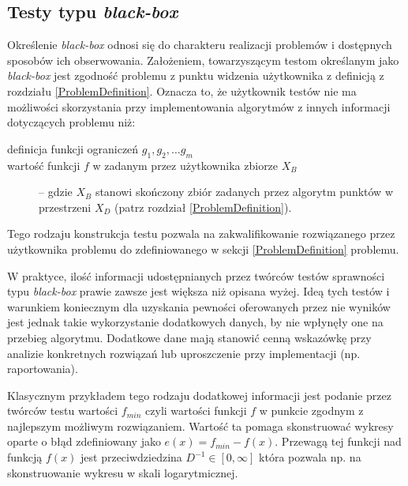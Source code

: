 \documentclass[12pt,a4paper]{report}
\begin{document}
{{{{{\subsection{Testy typu \emph{black-box}}
\par{
Określenie \emph{black-box} odnosi się do charakteru realizacji problemów i dostępnych sposobów ich obserwowania. Założeniem, towarzyszącym testom określanym jako \emph{black-box} jest zgodność problemu z punktu widzenia użytkownika z definicją z rozdziału \ref{ProblemDefinition}. Oznacza to, że użytkownik testów nie ma możliwości skorzystania przy implementowania algorytmów z innych informacji dotyczących problemu niż:
\begin{description}
\item[definicja funkcji ograniczeń $g_1, g_2, \ldots g_m$]
\item[wartość funkcji $f$ w zadanym przez użytkownika zbiorze $X_B$] -- gdzie $X_B$ stanowi skończony zbiór zadanych przez algorytm punktów w przestrzeni $X_D$ (patrz rozdział \ref{ProblemDefinition}).
\end{description}
Tego rodzaju konstrukcja testu pozwala na zakwalifikowanie rozwiązanego przez użytkownika problemu do zdefiniowanego w sekcji \ref{ProblemDefinition} problemu.
}
\par{
W praktyce, ilość informacji udostępnianych przez twórców testów sprawności typu \emph{black-box} prawie zawsze jest większa niż opisana wyżej. Ideą tych testów i warunkiem koniecznym dla uzyskania pewności oferowanych przez nie wyników jest jednak takie wykorzystanie dodatkowych danych, by nie wpłynęły one na przebieg algorytmu. Dodatkowe dane mają stanowić cenną wskazówkę przy analizie konkretnych rozwiązań lub uproszczenie przy implementacji (np. raportowania).
\par{
Klasycznym przykładem tego rodzaju dodatkowej informacji jest podanie przez twórców testu wartości $f_{min}$ czyli wartości funkcji $f$ w punkcie zgodnym z najlepszym możliwym rozwiązaniem. Wartość ta pomaga skonstruować wykresy oparte o błąd zdefiniowany jako $e(x) = f_{min} - f(x)$. Przewagą tej funkcji nad funkcją $f(x)$ jest przeciwdziedzina $D^{-1} \in [0, \infty]$ która pozwala np. na skonstruowanie wykresu w skali logarytmicznej.
}

}}}}}}
\end{document}
